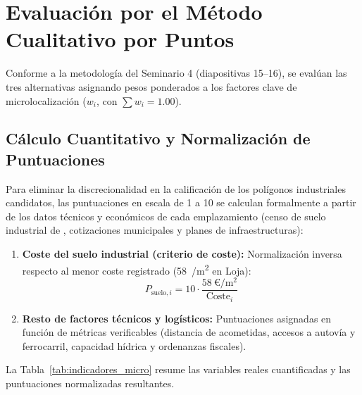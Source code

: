 \documentclass{report}
\begin{document}
\section{Evaluación por el Método Cualitativo por Puntos}
Conforme a la metodología del Seminario 4 (diapositivas 15--16), se evalúan las tres alternativas asignando pesos ponderados a los factores clave de microlocalización ($w_i$, con $\sum w_i = 1.00$).

\subsection{Cálculo Cuantitativo y Normalización de Puntuaciones}
Para eliminar la discrecionalidad en la calificación de los polígonos industriales candidatos, las puntuaciones en escala de 1 a 10 se calculan formalmente a partir de los datos técnicos y económicos de cada emplazamiento (censo de suelo industrial de \textcite{SueloIndustrial2026}, cotizaciones municipales y planes de infraestructuras):
\begin{enumerate}
    \item \textbf{Coste del suelo industrial (criterio de coste):} Normalización inversa respecto al menor coste registrado (\SI{58}{/\metre\squared} en Loja):
          \begin{equation}
              P_{\text{suelo}, i} = 10 \cdot \frac{\SI{58}{\text{€}/\metre\squared}}{\text{Coste}_i}
          \end{equation}
    \item \textbf{Resto de factores técnicos y logísticos:} Puntuaciones asignadas en función de métricas verificables (distancia de acometidas, accesos a autovía y ferrocarril, capacidad hídrica y ordenanzas fiscales).
\end{enumerate}

La Tabla~\ref{tab:indicadores_micro} resume las variables reales cuantificadas y las puntuaciones normalizadas resultantes.
\end{document}
